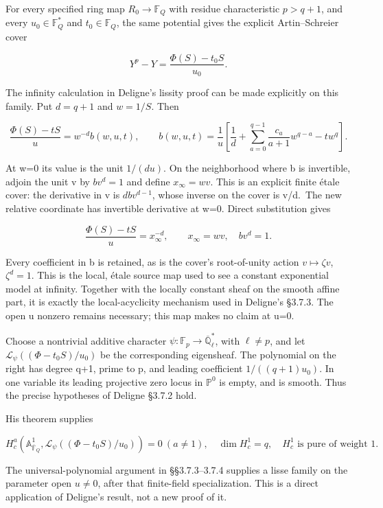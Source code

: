 For every specified ring map \(R_0\to\mathbb F_Q\) with residue characteristic \(p>q+1\), and every \(u_0\in\mathbb F_Q^*\) and \(t_0\in\mathbb F_Q\), the same potential gives the explicit Artin--Schreier cover

\[
\boxed{Y^p-Y=\frac{\Phi(S)-t_0S}{u_0}.}
\tag{47}
\]

The infinity calculation in Deligne's lissity proof can be made explicitly on this family. Put \(d=q+1\) and \(w=1/S\). Then

\[
\frac{\Phi(S)-tS}{u}=w^{-d}b(w,u,t),\qquad
b(w,u,t)=\frac1u\left[\frac1d+\sum_{a=0}^{q-1}\frac{c_a}{a+1}w^{q-a}-t w^q\right].
\tag{47a}
\]

At w=0 its value is the unit \(1/(du)\). On the neighborhood where b is invertible, adjoin the unit v by \(b v^d=1\) and define \(x_\infty=w v\). This is an explicit finite étale cover: the derivative in v is \(d b v^{d-1}\), whose inverse on the cover is v/d.~The new relative coordinate has invertible derivative at w=0. Direct substitution gives

\[
\boxed{\frac{\Phi(S)-tS}{u}=x_\infty^{-d},\qquad
x_\infty=w v,\quad b v^d=1.}
\tag{47b}
\]

Every coefficient in b is retained, as is the cover's root-of-unity action \(v\mapsto\zeta v\), \(\zeta^d=1\). This is the local, étale source map used to see a constant exponential model at infinity. Together with the locally constant sheaf on the smooth affine part, it is exactly the local-acyclicity mechanism used in Deligne's §3.7.3. The open u nonzero remains necessary; this map makes no claim at u=0.

Choose a nontrivial additive character \(\psi:\mathbb F_p\to\overline{\mathbb Q}_\ell^*\), with \(\ell\ne p\), and let \(\mathcal L_\psi((\Phi-t_0S)/u_0)\) be the corresponding eigensheaf. The polynomial on the right has degree q+1, prime to p, and leading coefficient \(1/((q+1)u_0)\). In one variable its leading projective zero locus in \(\mathbb P^0\) is empty, and is smooth. Thus the precise hypotheses of Deligne §3.7.2 hold.

His theorem supplies

\[
\boxed{
H_c^a(\mathbb A^1_{\overline{\mathbb F}_Q},
\mathcal L_\psi((\Phi-t_0S)/u_0))=0\ (a\ne1),\quad
\dim H_c^1=q,\quad H_c^1\text{ is pure of weight }1.
}
\tag{48}
\]

The universal-polynomial argument in §§3.7.3--3.7.4 supplies a lisse family on the parameter open \(u\ne0\), after that finite-field specialization. This is a direct application of Deligne's result, not a new proof of it.

